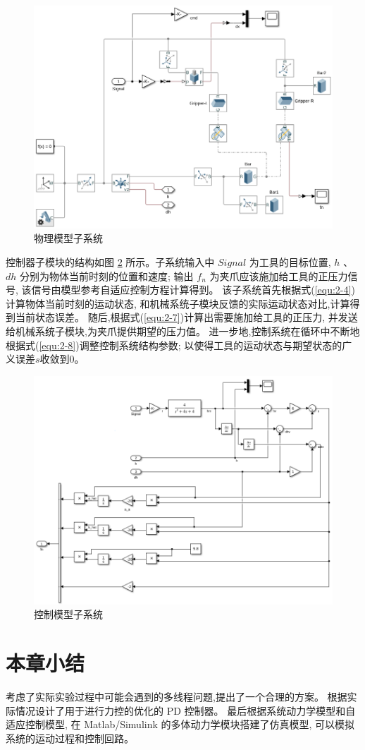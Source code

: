 \begin{figure}[!ht]
  \centering
  \includegraphics[scale=0.6]{chapter03/pic/3-5}
  \caption{物理模型子系统}
  \label{fig:3-5}
  \vspace{-0.3cm}
\end{figure}

控制器子模块的结构如图 \ref{fig:3-6} 所示。子系统输入中 $Signal$ 为工具的目标位置,
$h$ 、$dh$ 分别为物体当前时刻的位置和速度;
输出 $f_n$ 为夹爪应该施加给工具的正压力信号,
该信号由模型参考自适应控制方程计算得到。
该子系统首先根据式(\ref{equ:2-4})计算物体当前时刻的运动状态,
和机械系统子模块反馈的实际运动状态对比,计算得到当前状态误差。
随后,根据式(\ref{equ:2-7})计算出需要施加给工具的正压力,
并发送给机械系统子模块,为夹爪提供期望的压力值。
进一步地,控制系统在循环中不断地根据式(\ref{equ:2-8})调整控制系统结构参数;
以使得工具的运动状态与期望状态的广义误差$s$收敛到0。

\begin{figure}[!ht]
  \centering
  \includegraphics[scale=0.6]{chapter03/pic/3-6}
  \caption{控制模型子系统}
  \label{fig:3-6}
  \vspace{-0.3cm}
\end{figure}

\section{本章小结}
考虑了实际实验过程中可能会遇到的多线程问题,提出了一个合理的方案。
根据实际情况设计了用于进行力控的优化的 PD 控制器。
最后根据系统动力学模型和自适应控制模型,
在 Matlab/Simulink 的多体动力学模块搭建了仿真模型,
可以模拟系统的运动过程和控制回路。

